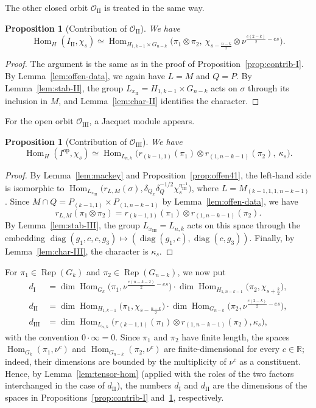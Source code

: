 \documentclass[11pt]{amsart}
\numberwithin{equation}{section}
\theoremstyle{plain}
\newtheorem{proposition}[theorem]{Proposition}
\theoremstyle{definition}
\theoremstyle{remark}
\newcommand{\R}{\mathbb{R}}
\DeclareMathOperator{\Hom}{Hom}
\DeclareMathOperator{\Rep}{Rep}
\DeclareMathOperator{\diag}{diag}
\newcommand{\dI}{d_{\mathrm{I}}}
\newcommand{\dII}{d_{\mathrm{II}}}
\newcommand{\dIII}{d_{\mathrm{III}}}
\newcommand{\OII}{\mathcal{O}_{\mathrm{II}}}
\newcommand{\OIII}{\mathcal{O}_{\mathrm{III}}}
\begin{document}
The other closed orbit $\OII$ is treated in the same way.

\begin{proposition}[Contribution of $\OII$]\label{prop:contrib-II}
	We have
	$$
	\Hom_H(I_{\mathrm{II}},\chi_s)\simeq\Hom_{H_{1,k-1}\times G_{n-k}}\Big(\pi_1\otimes\pi_2,\ \chi_{s-\frac{n-k}2}\otimes\nu^{\frac{e(2-k)}2-es}\Big).
	$$
\end{proposition}

\begin{proof}
	The argument is the same as in the proof of Proposition~\ref{prop:contrib-I}. By Lemma~\ref{lem:offen-data}, we again have $L=M$ and $Q=P$. By Lemma~\ref{lem:stab-II}, the group $L_{x_{\mathrm{II}}}=H_{1,k-1}\times G_{n-k}$ acts on $\sigma$ through its inclusion in $M$, and Lemma~\ref{lem:char-II} identifies the character.
\end{proof}

For the open orbit $\OIII$, a Jacquet module appears.

\begin{proposition}[Contribution of $\OIII$]\label{prop:contrib-III}
	We have
	$$
	\Hom_H(I^{\mathrm{op}},\chi_s)\simeq\Hom_{L_{n,k}}\big(r_{(k-1,1)}(\pi_1)\otimes r_{(1,n-k-1)}(\pi_2),\ \kappa_s\big).
	$$
\end{proposition}

\begin{proof}
	By Lemma~\ref{lem:mackey} and Proposition~\ref{prop:offen41}, the left-hand side is isomorphic to $\Hom_{L_{x_{\mathrm{III}}}}\big(r_{L,M}(\sigma),\delta_{Q_x}\delta_Q^{-1/2}\chi_s^{\eta_{\mathrm{III}}^{-1}}\big)$, where $L=M_{(k-1,1,1,n-k-1)}$. Since $M\cap Q=P_{(k-1,1)}\times P_{(1,n-k-1)}$ by Lemma~\ref{lem:offen-data}, we have
	$$
	r_{L,M}(\pi_1\otimes\pi_2)=r_{(k-1,1)}(\pi_1)\otimes r_{(1,n-k-1)}(\pi_2).
	$$
	By Lemma~\ref{lem:stab-III}, the group $L_{x_{\mathrm{III}}}=L_{n,k}$ acts on this space through the embedding $\diag(g_1,c,c,g_3)\mapsto(\diag(g_1,c),\diag(c,g_3))$. Finally, by Lemma~\ref{lem:char-III}, the character is $\kappa_s$.
\end{proof}

For $\pi_1\in\Rep(G_k)$ and $\pi_2\in\Rep(G_{n-k})$, we now put
\begin{align*}
	\dI&=\dim\Hom_{G_k}\big(\pi_1,\nu^{\frac{e(n-k-2)}2-es}\big)\cdot\dim\Hom_{H_{1,n-k-1}}\big(\pi_2,\chi_{s+\frac k2}\big),\\
	\dII&=\dim\Hom_{H_{1,k-1}}\big(\pi_1,\chi_{s-\frac{n-k}2}\big)\cdot\dim\Hom_{G_{n-k}}\big(\pi_2,\nu^{\frac{e(2-k)}2-es}\big),\\
	\dIII&=\dim\Hom_{L_{n,k}}\big(r_{(k-1,1)}(\pi_1)\otimes r_{(1,n-k-1)}(\pi_2),\kappa_s\big),
\end{align*}
with the convention $0\cdot\infty=0$. Since $\pi_1$ and $\pi_2$ have finite length, the spaces $\Hom_{G_k}(\pi_1,\nu^c)$ and $\Hom_{G_{n-k}}(\pi_2,\nu^c)$ are finite-dimensional for every $c\in\R$; indeed, their dimensions are bounded by the multiplicity of $\nu^c$ as a constituent. Hence, by Lemma~\ref{lem:tensor-hom} (applied with the roles of the two factors interchanged in the case of $\dII$), the numbers $\dI$ and $\dII$ are the dimensions of the spaces in Propositions~\ref{prop:contrib-I} and~\ref{prop:contrib-II}, respectively.
\end{document}
